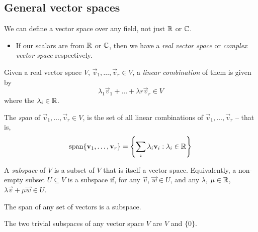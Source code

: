 \documentclass{../template/note}
\begin{document}
    \subsection{General vector spaces}

    \begin{definition}
        We can define a vector space over any field, not just \(\mathbb R\) or \(\mathbb C\).
        \begin{itemize}
            \item If our scalars are from \(\mathbb R\) or \(\mathbb C\), then we have a \emph{real vector space} or \emph{complex vector space} respectively.
        \end{itemize}
    \end{definition}

    \begin{definition}
        Given a real vector space \(V\), \(\vec v_1, \dots, \vec v_r \in V\), a \emph{linear combination} of them is given by
        \[  
            \lambda_1 \vec v_1 + \dots + \lambda r \vec v_r \in V
        \]
        where the \(\lambda_i \in \mathbb R\).
    \end{definition}
    
    \begin{definition}
        The \emph{span} of \(\vec v_1, \dots, \vec v_r \in V\), is the set of all linear combinations of \(\vec v_1, \dots, \vec v_r\) -- that is,
        \[
            \Span\{\vec v_1, \dots, \vec v_r\} = \left\{\sum_i \lambda_i \vec v_i: \lambda_i \in \RR\right\}
        \]
    \end{definition}
    
    \begin{definition}
        A \emph{subspace} of \(V\) is a subset of \(V\) that is itself a vector space. Equivalently, a non-empty subset \(U \subseteq V\) is a subspace if, for any \(\vec v\), \(\vec w \in U\), and any \(\lambda\), \(\mu \in \mathbb R\), \(\lambda \vec v + \mu \vec w \in U\).
    \end{definition}
    
    \begin{proposition}
        The span of any set of vectors is a subspace.
    \end{proposition}
    
    \begin{remark}
        The two trivial subspaces of any vector space \(V\) are \(V\) and \(\{0\}\).
    \end{remark}
    
\end{document}
